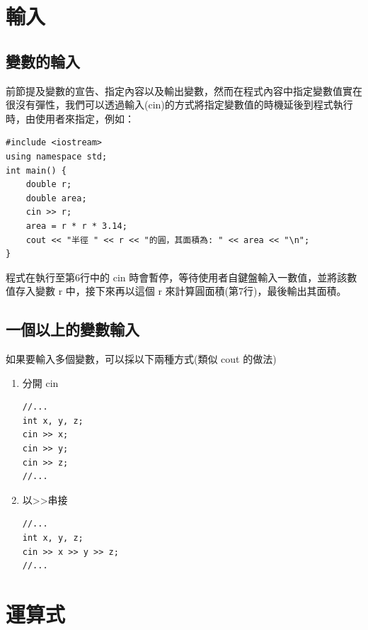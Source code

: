 \documentclass[a4paper,12pt]{article}
\begin{document}
\section{輸入}
\label{cpp_input}
\subsection{變數的輪入}
\label{sec:org7b49fd1}
前節提及變數的宣告、指定內容以及輸出變數，然而在程式內容中指定變數值實在很沒有彈性，我們可以透過輸入(cin)的方式將指定變數值的時機延後到程式執行時，由使用者來指定，例如：\\

\lstset{breaklines=true,language=cpp,label= ,caption= ,captionpos=b,firstnumber=1,numbers=left}
\begin{lstlisting}
#include <iostream>
using namespace std;
int main() {
    double r;
    double area;
    cin >> r;
    area = r * r * 3.14;
    cout << "半徑 " << r << "的圓，其面積為: " << area << "\n";
}
\end{lstlisting}

程式在執行至第6行中的 cin 時會暫停，等待使用者自鍵盤輸入一數值，並將該數值存入變數 r 中，接下來再以這個 r 來計算圓面積(第7行)，最後輸出其面積。\\

\subsection{一個以上的變數輸入}
\label{sec:org65c97c0}
如果要輸入多個變數，可以採以下兩種方式(類似 cout 的做法)\\
\begin{enumerate}
\item 分開 cin
\label{sec:org74e6dcf}
\lstset{breaklines=true,language=cpp,label= ,caption= ,captionpos=b,firstnumber=1,numbers=left}
\begin{lstlisting}
//...
int x, y, z;
cin >> x;
cin >> y;
cin >> z;
//...
\end{lstlisting}

\item 以>>串接
\label{sec:org4038ad1}
\lstset{breaklines=true,language=cpp,label= ,caption= ,captionpos=b,firstnumber=1,numbers=left}
\begin{lstlisting}
//...
int x, y, z;
cin >> x >> y >> z;
//...
\end{lstlisting}
\end{enumerate}

\section{運算式}
\label{cpp_operation}
\end{document}
